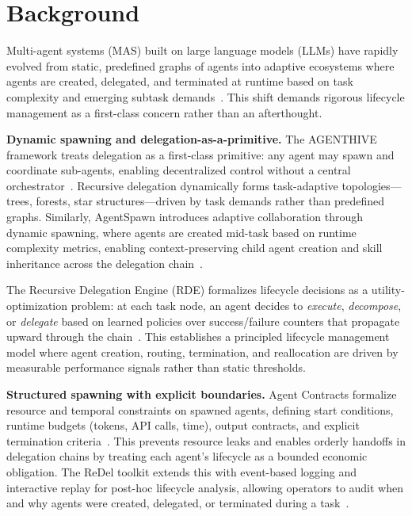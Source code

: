 \section{Background}


Multi-agent systems (MAS) built on large language models (LLMs) have rapidly evolved from static, predefined graphs of agents into adaptive ecosystems where agents are created, delegated, and terminated at runtime based on task complexity and emerging subtask demands~\cite{agenthive2025, agentspawn2026, redel2024}. This shift demands rigorous lifecycle management as a first-class concern rather than an afterthought.

\textbf{Dynamic spawning and delegation-as-a-primitive.} The AGENTHIVE framework treats delegation as a first-class primitive: any agent may spawn and coordinate sub-agents, enabling decentralized control without a central orchestrator~\cite{agenthive2025}. Recursive delegation dynamically forms task-adaptive topologies---trees, forests, star structures---driven by task demands rather than predefined graphs. Similarly, AgentSpawn introduces adaptive collaboration through dynamic spawning, where agents are created mid-task based on runtime complexity metrics, enabling context-preserving child agent creation and skill inheritance across the delegation chain~\cite{agentspawn2026}.

The Recursive Delegation Engine (RDE) formalizes lifecycle decisions as a utility-optimization problem: at each task node, an agent decides to \textit{execute}, \textit{decompose}, or \textit{delegate} based on learned policies over success/failure counters that propagate upward through the chain~\cite{rde2024}. This establishes a principled lifecycle management model where agent creation, routing, termination, and reallocation are driven by measurable performance signals rather than static thresholds.

\textbf{Structured spawning with explicit boundaries.} Agent Contracts formalize resource and temporal constraints on spawned agents, defining start conditions, runtime budgets (tokens, API calls, time), output contracts, and explicit termination criteria~\cite{agentcontracts2025}. This prevents resource leaks and enables orderly handoffs in delegation chains by treating each agent's lifecycle as a bounded economic obligation. The ReDel toolkit extends this with event-based logging and interactive replay for post-hoc lifecycle analysis, allowing operators to audit when and why agents were created, delegated, or terminated during a task~\cite{redel2024}.

